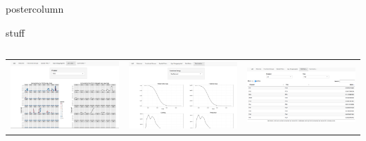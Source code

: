 \documentclass[final,hyperref={pdfpagelabels=false}]{beamer}
\begin{document}
\begin{frame}
\begin{columns}
\begin{column}{1\textwidth}
\begin{beamercolorbox}[center,wd=\textwidth]{postercolumn}
\begin{minipage}[T]{.98\textwidth}
{\begin{block}{stuff}
\begin{columns}
\begin{column}{.49\textwidth}
\begin{tabularx}{\linewidth}{ZZZ}
                   \includegraphics[width=1\linewidth]{images/vat4.png} & 
            \includegraphics[width=1\linewidth]{images/vat5.png} &
                  \includegraphics[width=1\linewidth]{images/vat6.png}


\end{tabularx}
\end{column}
\end{columns}
\end{block}}
\end{minipage}
\end{beamercolorbox}
\end{column}
\end{columns}
\end{frame}
\end{document}
